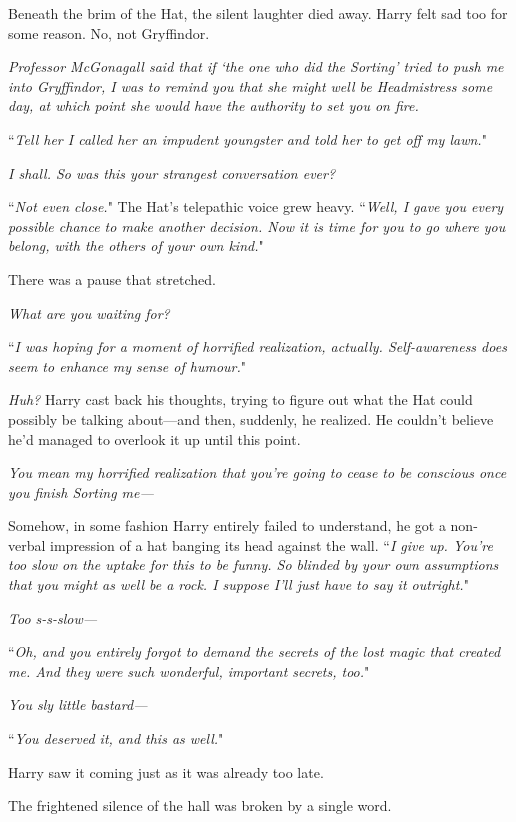 Beneath the brim of the Hat, the silent laughter died away. Harry felt sad too for some reason. No, not Gryffindor.

\emph{Professor McGonagall said that if `the one who did the Sorting' tried to push me into Gryffindor, I was to remind you that she might well be Headmistress some day, at which point she would have the authority to set you on fire.}

``\emph{Tell her I called her an impudent youngster and told her to get off my lawn.}"

\emph{I shall. So was this your strangest conversation ever?}

``\emph{Not even close.}" The Hat's telepathic voice grew heavy. ``\emph{Well, I gave you every possible chance to make another decision. Now it is time for you to go where you belong, with the others of your own kind.}"

There was a pause that stretched.

\emph{What are you waiting for?}

``\emph{I was hoping for a moment of horrified realization, actually. Self-awareness does seem to enhance my sense of humour.}"

\emph{Huh?} Harry cast back his thoughts, trying to figure out what the Hat could possibly be talking about—and then, suddenly, he realized. He couldn't believe he'd managed to overlook it up until this point.

\emph{You mean my horrified realization that you're going to cease to be conscious once you finish Sorting me—}

Somehow, in some fashion Harry entirely failed to understand, he got a non-verbal impression of a hat banging its head against the wall. ``\emph{I give up. You're too slow on the uptake for this to be funny. So blinded by your own assumptions that you might as well be a rock. I suppose I'll just have to say it outright.}"

\emph{Too s-s-slow—}

``\emph{Oh, and you entirely forgot to demand the secrets of the lost magic that created me. And they were such wonderful, important secrets, too.}"

\emph{You sly little \emph{bastard}—}

``\emph{You deserved it, and this as well.}"

Harry saw it coming just as it was already too late.

The frightened silence of the hall was broken by a single word.

